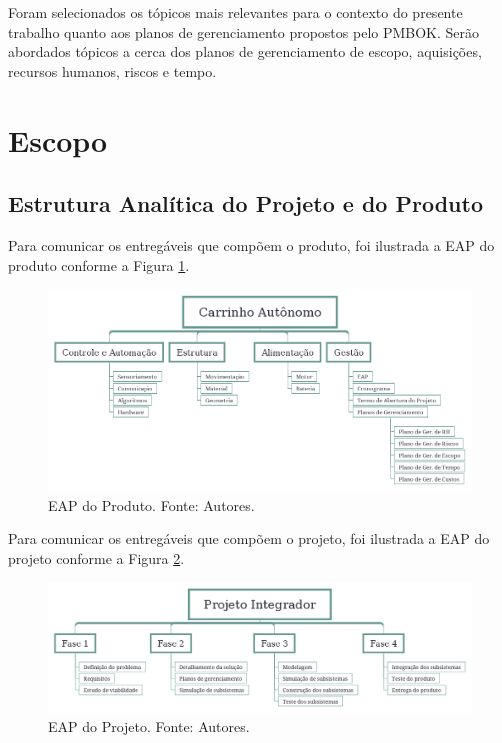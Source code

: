 Foram selecionados os tópicos mais relevantes para o contexto do presente trabalho quanto aos planos de gerenciamento propostos pelo PMBOK. Serão abordados tópicos a cerca dos planos de gerenciamento de escopo, aquisições, recursos humanos, riscos  e tempo.

\section{Escopo}

\subsection{Estrutura Analítica do Projeto e do Produto}

Para comunicar os entregáveis que compõem o produto, foi ilustrada a EAP do produto conforme a Figura \ref{fig:eap_produto}.

\begin{figure}[htpb!]
    \centering
    \includegraphics[scale= 0.4]{figuras/eap_produto.png}
    \caption{EAP do Produto. Fonte: Autores.}
    \label{fig:eap_produto}
\end{figure}

Para comunicar os entregáveis que compõem o projeto, foi ilustrada a EAP do projeto conforme a Figura \ref{fig:eap_projeto}.

\begin{figure}[htpb!]
    \centering
    \includegraphics[scale= 0.35]{figuras/eap_projeto.png}
    \caption{EAP do Projeto. Fonte: Autores.}
    \label{fig:eap_projeto}
\end{figure}

